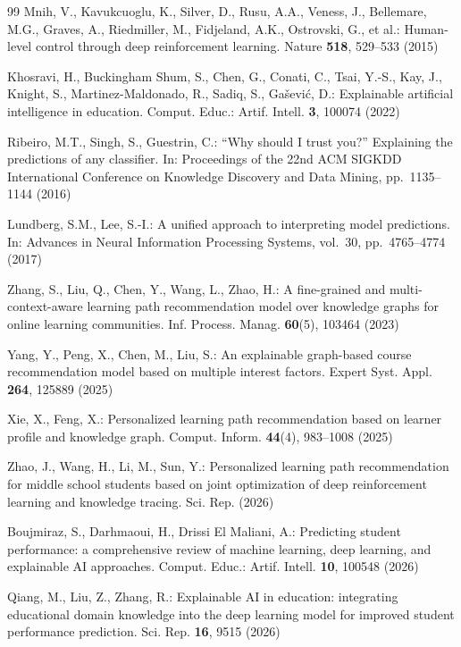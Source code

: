 \documentclass[graybox]{SNmult}
\begin{document}
\begin{thebibliography}{99}
Mnih, V., Kavukcuoglu, K., Silver, D., Rusu, A.A., Veness, J., Bellemare, M.G., Graves, A.,
Riedmiller, M., Fidjeland, A.K., Ostrovski, G., et al.: Human-level control through deep
reinforcement learning. Nature \textbf{518}, 529--533 (2015)

Khosravi, H., Buckingham Shum, S., Chen, G., Conati, C., Tsai, Y.-S., Kay, J., Knight, S.,
Martinez-Maldonado, R., Sadiq, S., Ga\v{s}evi\'{c}, D.: Explainable artificial intelligence
in education. Comput. Educ.: Artif. Intell. \textbf{3}, 100074 (2022)

Ribeiro, M.T., Singh, S., Guestrin, C.: ``Why should I trust you?'' Explaining the
predictions of any classifier. In: Proceedings of the 22nd ACM SIGKDD International
Conference on Knowledge Discovery and Data Mining, pp.~1135--1144 (2016)

Lundberg, S.M., Lee, S.-I.: A unified approach to interpreting model predictions. In:
Advances in Neural Information Processing Systems, vol.~30, pp.~4765--4774 (2017)

Zhang, S., Liu, Q., Chen, Y., Wang, L., Zhao, H.: A fine-grained and multi-context-aware
learning path recommendation model over knowledge graphs for online learning communities.
Inf. Process. Manag. \textbf{60}(5), 103464 (2023)

Yang, Y., Peng, X., Chen, M., Liu, S.: An explainable graph-based course recommendation
model based on multiple interest factors. Expert Syst. Appl. \textbf{264}, 125889 (2025)

Xie, X., Feng, X.: Personalized learning path recommendation based on learner profile and
knowledge graph. Comput. Inform. \textbf{44}(4), 983--1008 (2025)

Zhao, J., Wang, H., Li, M., Sun, Y.: Personalized learning path recommendation for middle
school students based on joint optimization of deep reinforcement learning and knowledge
tracing. Sci. Rep. (2026)

Boujmiraz, S., Darhmaoui, H., Drissi El Maliani, A.: Predicting student performance: a
comprehensive review of machine learning, deep learning, and explainable AI approaches.
Comput. Educ.: Artif. Intell. \textbf{10}, 100548 (2026)

Qiang, M., Liu, Z., Zhang, R.: Explainable AI in education: integrating educational domain
knowledge into the deep learning model for improved student performance prediction. Sci.
Rep. \textbf{16}, 9515 (2026)


\end{thebibliography}
\end{document}
